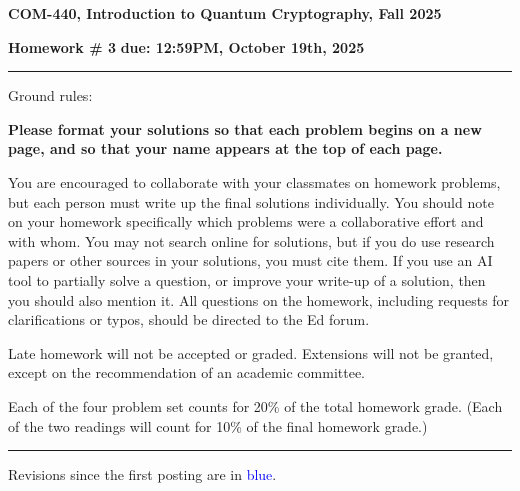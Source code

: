 \documentclass[12pt]{article}
\newcommand{\header}[1]{\begin{center} {\large\bf #1} \end{center}}
\begin{document}
\header{COM-440, Introduction to Quantum Cryptography, Fall 2025}
{\bf Homework \# 3} \hfill {\bf due: 12:59PM, {\color{blue}October 19th}, 2025}


\medskip

\hrule

\medskip 

Ground rules: 

{\bf Please
  format your solutions so that each problem begins on a new page, and
  so that your name appears at the top of each page.}

You are encouraged to collaborate with your classmates on
homework problems, but each person must write up the final solutions
individually. You should note on your homework specifically which
problems were a collaborative effort and with whom. You may not search
online for solutions, but if you do use research papers or other
sources in your solutions, you must cite them. If you use an AI tool to 
partially solve a question, or improve your write-up of a solution, then 
you should also mention it. All questions on the homework, including requests for clarifications or typos, should be directed to the Ed forum.

Late homework will not be accepted or graded. Extensions will not be granted, except on the recommendation of an academic committee. 

Each of the four problem set counts for 20\% of the total homework grade. (Each of the two readings will count for 10\% of the final homework grade.)


\medskip

\hrule

\medskip



Revisions since the first posting are in \textcolor{blue}{blue}.
\end{document}
